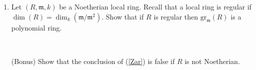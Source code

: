 \documentclass{amsart}[12pt]
\numberwithin{equation}{section}
\theoremstyle{plain} %
\theoremstyle{definition}
\theoremstyle{remark}
\begin{document}
\begin{enumerate}
\

\item Let $(R,\mathfrak{m},k)$ be a Noetherian local ring. Recall that a local ring is regular if $\dim(R) = \dim_k(\mathfrak{m}/\mathfrak{m}^2)$.
Show that if $R$ is regular then $\mathrm{gr}_{\mathfrak{m}}(R)$ is a polynomial ring.

\


\item[(Bonus)] Show that the conclusion of (\ref{Zar}) is false if $R$ is not Noetherian.


\end{enumerate}
\end{document}
